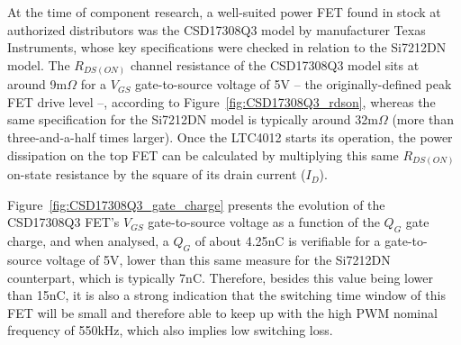 
%
%


At the time of component research, a well-suited power FET found in stock at authorized distributors was the CSD17308Q3 model by manufacturer Texas Instruments, whose key specifications were checked in relation to the Si7212DN model. The $R_{DS(ON)}$ channel resistance of the CSD17308Q3 model sits at around 9m$\Omega$ for a $V_{GS}$ gate-to-source voltage of 5V -- the originally-defined peak FET drive level --, according to Figure~\ref{fig:CSD17308Q3_rdson}, whereas the same specification for the Si7212DN model is typically around 32m$\Omega$ (more than three-and-a-half times larger).
Once the LTC4012 starts its operation, the power dissipation on the top FET can be calculated by multiplying this same $R_{DS(ON)}$ on-state resistance by the square of its drain current ($I_D$).

Figure~\ref{fig:CSD17308Q3_gate_charge} presents the evolution of the CSD17308Q3 FET's $V_{GS}$ gate-to-source voltage as a function of the $Q_G$ gate charge, and when analysed, a $Q_G$ of about 4.25nC is verifiable for a gate-to-source voltage of 5V, lower than this same measure for the Si7212DN counterpart, which is typically 7nC. Therefore, besides this value being lower than 15nC, it is also a strong indication that the switching time window of this FET will be small and therefore able to keep up with the high PWM nominal frequency of 550kHz, which also implies low switching loss.

